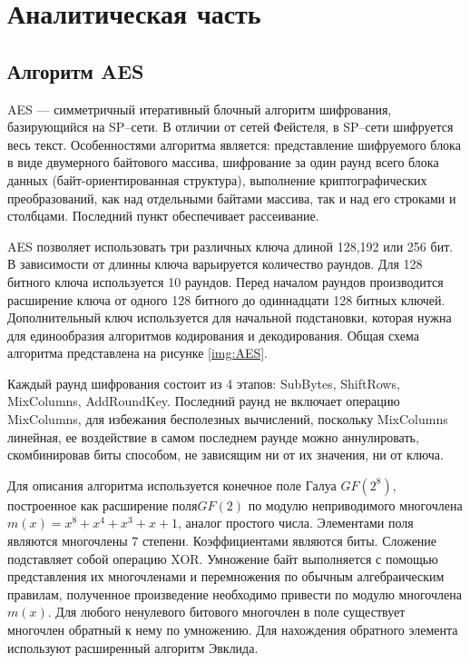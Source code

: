 \chapter{Аналитическая часть}

\section{Алгоритм AES}

AES --- симметричный итеративный блочный алгоритм шифрования, базирующийся на SP--сети. В отличии от сетей Фейстеля, в SP--сети шифруется весь текст. Особенностями алгоритма является: представление шифруемого блока в виде двумерного байтового массива, шифрование за один раунд всего блока данных (байт-ориентированная структура), выполнение криптографических преобразований, как над отдельными байтами массива, так и над его строками и столбцами. Последний пункт обеспечивает рассеивание.

AES позволяет использовать три различных ключа длиной 128,192 или 256 бит. В зависимости от длинны ключа варьируется количество раундов. Для 128 битного ключа используется 10 раундов. Перед началом раундов производится расширение ключа от одного 128 битного до одиннадцати 128 битных ключей. Дополнительный ключ используется для начальной подстановки, которая нужна для единообразия алгоритмов кодирования и декодирования. Общая схема алгоритма представлена на рисунке \ref{img:AES}.

Каждый раунд шифрования состоит из 4 этапов: SubBytes, ShiftRows, MixColumns, AddRoundKey. Последний раунд не включает операцию MixColumns, для избежания бесполезных вычислений, поскольку MixColumns линейная, ее воздействие в самом последнем раунде можно аннулировать, скомбинировав биты способом, не зависящим ни от их значения, ни от ключа.

Для описания алгоритма используется конечное поле Галуа $GF(2^8)$, построенное как расширение поля$GF(2)$ по модулю неприводимого многочлена $m(x) = x^8 + x^4 + x^3 + x + 1$, аналог простого числа. Элементами поля являются многочлены 7 степени. Коэффициентами являются биты. Сложение подставляет собой операцию XOR. Умножение байт выполняется с помощью представления их многочленами и перемножения по обычным алгебраическим правилам, полученное произведение необходимо привести по модулю многочлена $m(x)$. Для любого ненулевого битового многочлен в поле существует многочлен обратный к нему по умножению. Для нахождения обратного элемента используют расширенный алгоритм Эвклида.

